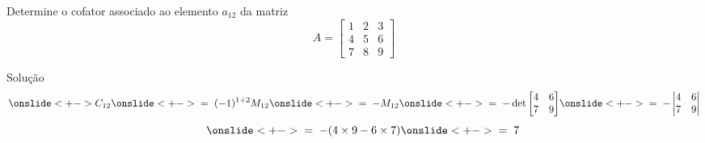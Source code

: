 \begin{question}
  Determine o cofator associado ao elemento $a_{12}$
  da matriz
  \[
    A =
    \begin{bmatrix}
      1 & 2 & 3 \\
      4 & 5 & 6 \\
      7 & 8 & 9
    \end{bmatrix}
  \]
\end{question}

\begin{resolution}{Solução}
  \[
    \onslide<+->{C_{12}}
    \onslide<+->{\;=\; (-1)^{1+2}M_{12}}
    \onslide<+->{\;=\; -M_{12}}
    \onslide<+->{\;=\;
    -\det
    \begin{bmatrix}
      4 & 6 \\
      7 & 9
    \end{bmatrix}}
    \onslide<+->{\;=\;
      -\begin{vmatrix}
        4 & 6 \\
        7 & 9
      \end{vmatrix}}
  \]
  \[
    \hphantom{C_{12}}
    \onslide<+->{\;=\; -(4 \times 9 - 6 \times 7)}
    \onslide<+->{\;=\; 7}
  \]
\end{resolution}

\endinput




